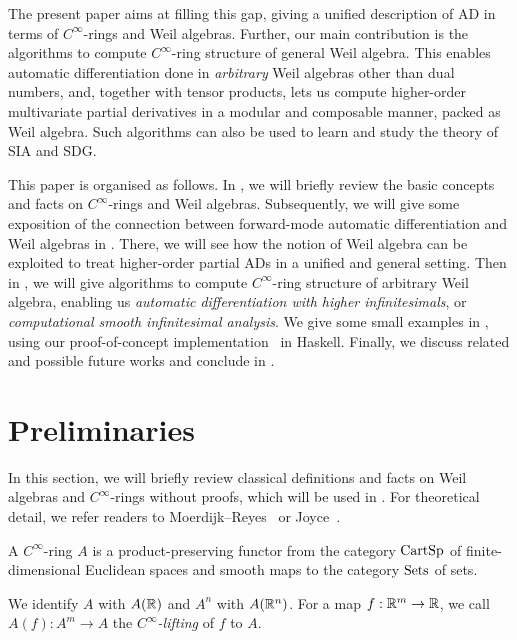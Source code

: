 \documentclass[%
  sigconf,authorversion,screen]{acmart}
\begin{document}
The present paper aims at filling this gap, giving a unified description of AD in terms of $C^\infty$-rings and Weil algebras.
Further, our main contribution is the algorithms to compute $C^\infty$-ring structure of general Weil algebra.
This enables automatic differentiation done in \emph{arbitrary} Weil algebras other than dual numbers, and, together with tensor products, lets us compute higher-order multivariate partial derivatives in a modular and composable manner, packed as Weil algebra.
Such algorithms can also be used to learn and study the theory of SIA and SDG.

This paper is organised as follows.
In , we will briefly review the basic concepts and facts on $C^\infty$-rings and Weil algebras.
Subsequently, we will give some exposition of the connection between forward-mode automatic differentiation and Weil algebras in .
There, we will see how the notion of Weil algebra can be exploited to treat higher-order partial ADs in a unified and general setting.
Then in , we will give algorithms to compute $C^\infty$-ring structure of arbitrary Weil algebra, enabling us \emph{automatic differentiation with higher infinitesimals}, or \emph{computational smooth infinitesimal analysis}.
We give some small examples in , using our proof-of-concept implementation~\cite{Ishii:2020aa} in Haskell.
Finally, we discuss related and possible future works and conclude in .

\section{Preliminaries}\label{sec:prel}
In this section, we will briefly review classical definitions and facts on Weil algebras and $C^\infty$-rings without proofs, which will be used in .
For theoretical detail, we refer readers to Moerdijk--Reyes~\cite[Chapters I and II]{Moerdijk:1991aa} or Joyce~\cite{joyce2016algebraic}.

\begin{definition}
  A \emph{$C^\infty$}-ring $A$ is a product-preserving functor from the category $\mathord{\mathrm{CartSp}}$ of finite-dimensional Euclidean spaces and smooth maps to the category $\mathord{\mathrm{Sets}}$ of sets.

  We identify $A$ with $A(\mathbb{R})$ and $A^n$ with $A(\mathbb{R}^n)$.
  For a map $f: \mathbb{R}^m \to \mathbb{R}$, we call $A(f): A^m \to A$ the \emph{$C^\infty$-lifting} of $f$ to $A$.
\end{definition}
\end{document}
